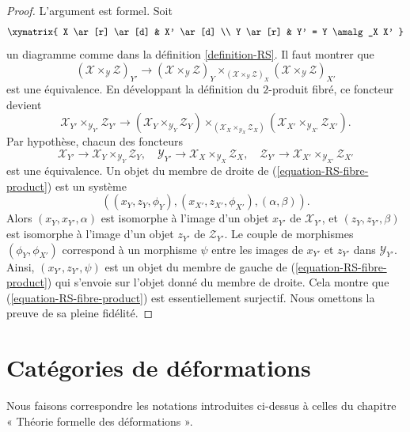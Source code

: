 \begin{proof}
L'argument est formel. Soit
$$
\xymatrix{
X \ar[r] \ar[d] & X' \ar[d] \\
Y \ar[r] & Y' = Y \amalg_X X'
}
$$
un diagramme comme dans la définition \ref{definition-RS}. Il faut montrer que
$$
(\mathcal{X} \times_{\mathcal{Y}} \mathcal{Z})_{Y'}
\longrightarrow
(\mathcal{X} \times_{\mathcal{Y}} \mathcal{Z})_Y
\times_{(\mathcal{X} \times_{\mathcal{Y}} \mathcal{Z})_X}
(\mathcal{X} \times_{\mathcal{Y}} \mathcal{Z})_{X'}
$$
est une équivalence. En développant la définition du $2$-produit fibré, ce
foncteur devient
\begin{equation}
\label{equation-RS-fibre-product}
\mathcal{X}_{Y'} \times_{\mathcal{Y}_{Y'}} \mathcal{Z}_{Y'}
\longrightarrow
(\mathcal{X}_Y \times_{\mathcal{Y}_Y} \mathcal{Z}_Y)
\times_{(\mathcal{X}_X \times_{\mathcal{Y}_X} \mathcal{Z}_X)}
(\mathcal{X}_{X'} \times_{\mathcal{Y}_{X'}} \mathcal{Z}_{X'}).
\end{equation}
Par hypothèse, chacun des foncteurs
$$
\mathcal{X}_{Y'} \to \mathcal{X}_Y \times_{\mathcal{Y}_Y} \mathcal{Z}_Y,
\quad
\mathcal{Y}_{Y'} \to \mathcal{X}_X \times_{\mathcal{Y}_X} \mathcal{Z}_X,
\quad
\mathcal{Z}_{Y'} \to
\mathcal{X}_{X'} \times_{\mathcal{Y}_{X'}} \mathcal{Z}_{X'}
$$
est une équivalence. Un objet du membre de droite de
(\ref{equation-RS-fibre-product}) est un système
$$
((x_Y, z_Y, \phi_Y), (x_{X'}, z_{X'}, \phi_{X'}), (\alpha, \beta)).
$$
Alors $(x_Y,x_{Y'},\alpha)$ est isomorphe à l'image d'un objet $x_{Y'}$ de
$\mathcal{X}_{Y'}$, et $(z_Y,z_{Y'},\beta)$ est isomorphe à l'image d'un objet
$z_{Y'}$ de $\mathcal{Z}_{Y'}$. Le couple de morphismes
$(\phi_Y,\phi_{X'})$ correspond à un morphisme $\psi$ entre les images de
$x_{Y'}$ et $z_{Y'}$ dans $\mathcal{Y}_{Y'}$. Ainsi,
$(x_{Y'},z_{Y'},\psi)$ est un objet du membre de gauche de
(\ref{equation-RS-fibre-product}) qui s'envoie sur l'objet donné du membre de
droite. Cela montre que (\ref{equation-RS-fibre-product}) est essentiellement
surjectif. Nous omettons la preuve de sa pleine fidélité.
\end{proof}





\section{Catégories de déformations}
\label{section-deformation-categories}

\noindent
Nous faisons correspondre les notations introduites ci-dessus à celles du
chapitre « Théorie formelle des déformations ».

